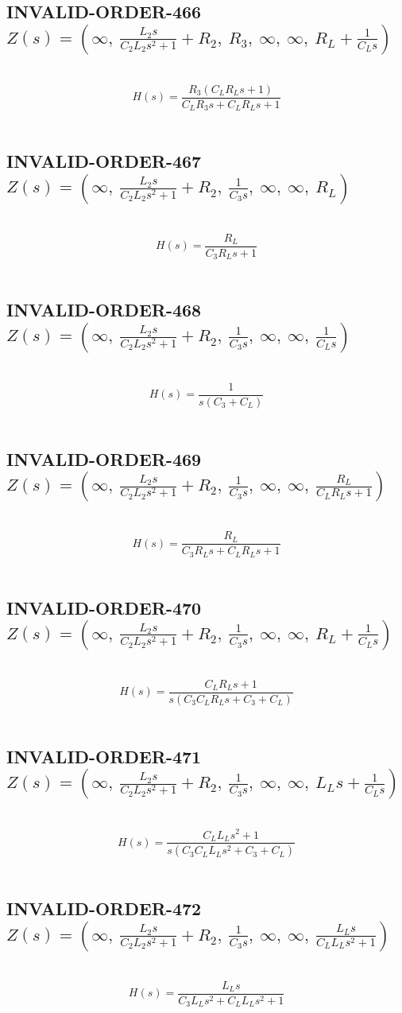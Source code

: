 \documentclass{article}
\begin{document}
\subsection{INVALID-ORDER-466 $Z(s) = \left( \infty, \  \frac{L_{2} s}{C_{2} L_{2} s^{2} + 1} + R_{2}, \  R_{3}, \  \infty, \  \infty, \  R_{L} + \frac{1}{C_{L} s}\right)$ } \ 
\textbf{\[H(s) = \frac{R_{3} \left(C_{L} R_{L} s + 1\right)}{C_{L} R_{3} s + C_{L} R_{L} s + 1}\] } \ 
\subsection{INVALID-ORDER-467 $Z(s) = \left( \infty, \  \frac{L_{2} s}{C_{2} L_{2} s^{2} + 1} + R_{2}, \  \frac{1}{C_{3} s}, \  \infty, \  \infty, \  R_{L}\right)$ } \ 
\textbf{\[H(s) = \frac{R_{L}}{C_{3} R_{L} s + 1}\] } \ 
\subsection{INVALID-ORDER-468 $Z(s) = \left( \infty, \  \frac{L_{2} s}{C_{2} L_{2} s^{2} + 1} + R_{2}, \  \frac{1}{C_{3} s}, \  \infty, \  \infty, \  \frac{1}{C_{L} s}\right)$ } \ 
\textbf{\[H(s) = \frac{1}{s \left(C_{3} + C_{L}\right)}\] } \ 
\subsection{INVALID-ORDER-469 $Z(s) = \left( \infty, \  \frac{L_{2} s}{C_{2} L_{2} s^{2} + 1} + R_{2}, \  \frac{1}{C_{3} s}, \  \infty, \  \infty, \  \frac{R_{L}}{C_{L} R_{L} s + 1}\right)$ } \ 
\textbf{\[H(s) = \frac{R_{L}}{C_{3} R_{L} s + C_{L} R_{L} s + 1}\] } \ 
\subsection{INVALID-ORDER-470 $Z(s) = \left( \infty, \  \frac{L_{2} s}{C_{2} L_{2} s^{2} + 1} + R_{2}, \  \frac{1}{C_{3} s}, \  \infty, \  \infty, \  R_{L} + \frac{1}{C_{L} s}\right)$ } \ 
\textbf{\[H(s) = \frac{C_{L} R_{L} s + 1}{s \left(C_{3} C_{L} R_{L} s + C_{3} + C_{L}\right)}\] } \ 
\subsection{INVALID-ORDER-471 $Z(s) = \left( \infty, \  \frac{L_{2} s}{C_{2} L_{2} s^{2} + 1} + R_{2}, \  \frac{1}{C_{3} s}, \  \infty, \  \infty, \  L_{L} s + \frac{1}{C_{L} s}\right)$ } \ 
\textbf{\[H(s) = \frac{C_{L} L_{L} s^{2} + 1}{s \left(C_{3} C_{L} L_{L} s^{2} + C_{3} + C_{L}\right)}\] } \ 
\subsection{INVALID-ORDER-472 $Z(s) = \left( \infty, \  \frac{L_{2} s}{C_{2} L_{2} s^{2} + 1} + R_{2}, \  \frac{1}{C_{3} s}, \  \infty, \  \infty, \  \frac{L_{L} s}{C_{L} L_{L} s^{2} + 1}\right)$ } \ 
\textbf{\[H(s) = \frac{L_{L} s}{C_{3} L_{L} s^{2} + C_{L} L_{L} s^{2} + 1}\] } \ 
\end{document}
